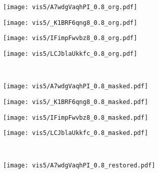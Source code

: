 \documentclass{article}
\begin{document}
{\begin{figure}[h!]
    \begin{subfigure}[b]{0.245\linewidth}
        \texttt{[image: vis5/A7wdgVaqhPI\_0.8\_org.pdf]}
    \end{subfigure}     
    \begin{subfigure}[b]{0.245\linewidth}
        \texttt{[image: vis5/\_K1BRF6qng8\_0.8\_org.pdf]}
    \end{subfigure}    
    \begin{subfigure}[b]{0.245\linewidth}
        \texttt{[image: vis5/IFimpFwvbz8\_0.8\_org.pdf]}
    \end{subfigure}
    \begin{subfigure}[b]{0.245\linewidth}
        \texttt{[image: vis5/LCJblaUkkfc\_0.8\_org.pdf]}
    \end{subfigure}
    \\
    \begin{subfigure}[b]{0.245\linewidth}
        \texttt{[image: vis5/A7wdgVaqhPI\_0.8\_masked.pdf]}
    \end{subfigure}     
    \begin{subfigure}[b]{0.245\linewidth}
        \texttt{[image: vis5/\_K1BRF6qng8\_0.8\_masked.pdf]}
    \end{subfigure}
    \begin{subfigure}[b]{0.245\linewidth}
        \texttt{[image: vis5/IFimpFwvbz8\_0.8\_masked.pdf]}
    \end{subfigure}
    \begin{subfigure}[b]{0.245\linewidth}
        \texttt{[image: vis5/LCJblaUkkfc\_0.8\_masked.pdf]}
    \end{subfigure}
    \\ 
    \begin{subfigure}[b]{0.245\linewidth}
        \texttt{[image: vis5/A7wdgVaqhPI\_0.8\_restored.pdf]}
        \label{fig:app:vis:e}
    \end{subfigure}

\end{figure}}
\end{document}
